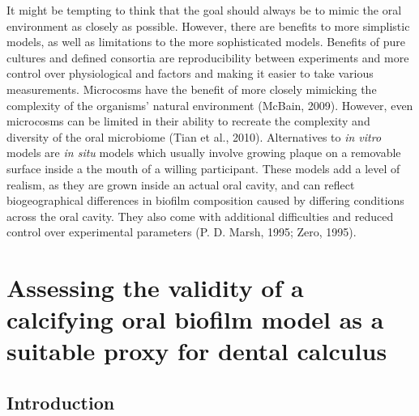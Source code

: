 \documentclass[
  letterpaper,
]{book}
\begin{document}
It might be tempting to think that the goal should always be to mimic
the oral environment as closely as possible. However, there are benefits
to more simplistic models, as well as limitations to the more
sophisticated models. Benefits of pure cultures and defined consortia
are reproducibility between experiments and more control over
physiological and factors and making it easier to take various
measurements. Microcosms have the benefit of more closely mimicking the
complexity of the organisms' natural environment (McBain, 2009).
However, even microcosms can be limited in their ability to recreate the
complexity and diversity of the oral microbiome (Tian et al., 2010).
Alternatives to \emph{in vitro} models are \emph{in situ} models which
usually involve growing plaque on a removable surface inside a the mouth
of a willing participant. These models add a level of realism, as they
are grown inside an actual oral cavity, and can reflect biogeographical
differences in biofilm composition caused by differing conditions across
the oral cavity. They also come with additional difficulties and reduced
control over experimental parameters (P. D. Marsh, 1995; Zero, 1995).


\hypertarget{byoc-valid}{%
\chapter{Assessing the validity of a calcifying oral biofilm model as a
suitable proxy for dental calculus}\label{byoc-valid}}

\hypertarget{introduction}{%
\section{Introduction}\label{introduction}}
\end{document}
